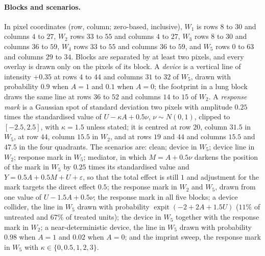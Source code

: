 \paragraph{Blocks and scenarios.} In pixel coordinates (row, column; zero-based, inclusive), $W_1$ is rows $8$ to $30$ and columns $4$ to $27$, $W_2$ rows $33$ to $55$ and columns $4$ to $27$, $W_3$ rows $8$ to $30$ and columns $36$ to $59$, $W_4$ rows $33$ to $55$ and columns $36$ to $59$, and $W_5$ rows $0$ to $63$ and columns $29$ to $34$. Blocks are separated by at least two pixels, and every overlay is drawn only on the pixels of its block. A \emph{device} is a vertical line of intensity $+0.35$ at rows $4$ to $44$ and columns $31$ to $32$ of $W_5$, drawn with probability $0.9$ when $A=1$ and $0.1$ when $A=0$; the footprint in a lung block draws the same line at rows $36$ to $52$ and columns $14$ to $15$ of $W_2$. A \emph{response mark} is a Gaussian spot of standard deviation two pixels with amplitude $0.25$ times the standardised value of $U-\kappa A+0.5\nu$, $\nu\sim N(0,1)$, clipped to $[-2.5,2.5]$, with $\kappa=1.5$ unless stated; it is centred at row $20$, column $31.5$ in $W_5$, at row $44$, column $15.5$ in $W_2$, and at rows $19$ and $44$ and columns $15.5$ and $47.5$ in the four quadrants. The scenarios are: clean; device in $W_5$; device line in $W_2$; response mark in $W_5$; mediator, in which $M=A+0.5\nu$ darkens the position of the mark in $W_5$ by $0.25$ times its standardised value and $Y=0.5A+0.5M+U+\varepsilon$, so that the total effect is still $1$ and adjustment for the mark targets the direct effect $0.5$; the response mark in $W_2$ and $W_5$, drawn from one value of $U-1.5A+0.5\nu$; the response mark in all five blocks; a device collider, the line in $W_5$ drawn with probability $\operatorname{expit}(-2+2A+1.5U)$ ($11\%$ of untreated and $67\%$ of treated units); the device in $W_5$ together with the response mark in $W_2$; a near-deterministic device, the line in $W_5$ drawn with probability $0.98$ when $A=1$ and $0.02$ when $A=0$; and the imprint sweep, the response mark in $W_5$ with $\kappa\in\{0,0.5,1,2,3\}$.

